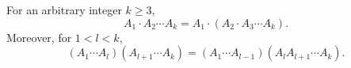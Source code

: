 For an arbitrary integer $k \geq 3$,
$$A_1 \cdot A_2 \cdots A_k = A_1 \cdot (A_2 \cdot A_3 \cdots A_k).$$
Moreover, for $1 < l < k$,
$$(A_1 \cdots A_l)(A_{l+1} \cdots A_k) = (A_1 \cdots A_{l-1})(A_l A_{l+1} \cdots A_k).$$
